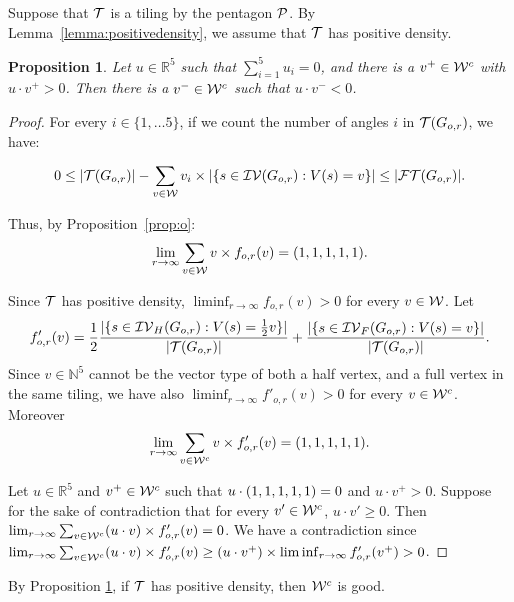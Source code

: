 \documentclass[11pt]{article}
\newtheorem{proposition}[theorem]{Proposition}
\theoremstyle{definition}
\begin{document}
\def\poly{\mathfrak{P}}

Suppose that $\mathcal{T}$ is a tiling by the pentagon $\mathcal{P}$. %
By Lemma~\ref{lemma:positivedensity}, we assume that $\mathcal{T}$ has positive density.

\begin{proposition}\label{prop:good}
  Let $u\in\mathbb{R}^5$ such that $\sum_{i=1}^5 u_i=0$, and there is a $v^+\in{{\mathcal{W}}^c}$ with $u\cdot v^+>0$. Then there is a $v^-\in{{\mathcal{W}}^c}$ such that $u\cdot v^-<0$.
\end{proposition}
\begin{proof}
  For every $i\in\{1,\ldots 5\}$, if we count the number of angles $i$ in $\mathcal{T}(G_{o,r})$, we have:
  
  $$0 \le |\mathcal{T}(G_{o,r})| - \sum_{v\in\mathcal{W}} v_i \times |\{ s\in \mathcal{IV}(G_{o,r}) : V(s) = v \}| \le |\mathcal{FT}(G_{o,r})|. $$
  
  Thus, by Proposition~\ref{prop:o}: $$ \lim_{r\to\infty} \sum_{v\in\setvectype} v \times f_{o,r}(v) = \v1.$$ %
  
  Since $\mathcal{T}$ has positive density, $\liminf_{r\to\infty} f_{o,r}(v)>0$ for every $v\in\mathcal{W}$.
  Let $$f'_{o,r}(v)=\frac{1}{2}\frac{|\{ s\in \mathcal{IV}_H(G_{o,r}) : V(s) = \frac{1}{2} v \}|}{|\mathcal{T}(G_{o,r})|} + \frac{|\{ s\in \mathcal{IV}_F(G_{o,r}) : V(s) = v \}|}{|\mathcal{T}(G_{o,r})|}.$$
  Since $v\in\mathbb{N}^5$ cannot be the vector type of both a half vertex, and a full vertex in the same tiling, we have also $\liminf_{r\to\infty} f'_{o,r}(v)>0$ for every $v\in{{\mathcal{W}}^c}$.
  Moreover $$\lim_{r\to\infty} \sum_{v\in\setvecctype} v \times f'_{o,r}(v) = \v1 .$$
  
  
  Let $u\in \mathbb{R}^5$ and $v^+\in {{\mathcal{W}}^c}$ such that $u\cdot \v1=0$ and $u\cdot v^+>0$.
  Suppose for the sake of contradiction that for every $v'\in {{\mathcal{W}}^c}$, $u\cdot v'\ge 0$.
  Then $\lim_{r\to\infty} \sum_{v\in{{\mathcal{W}}^c}} (u\cdot v) \times f'_{o,r}(v)=0$.
  We have a contradiction since $\lim_{r\to\infty} \sum_{v\in{{\mathcal{W}}^c}} (u\cdot v) \times f'_{o,r}(v) \ge (u\cdot v^+)\times \liminf_{r\to\infty} f'_{o,r}(v^+)>0$.
\end{proof}

%
%
%
%
%
%
%

By Proposition \ref{prop:good}, if $\mathcal{T}$ has positive density, then ${{\mathcal{W}}^c}$ is good. %


\def\span{\operatorname{span}}
\def\compat{\operatorname{Compat}} 
\end{document}
